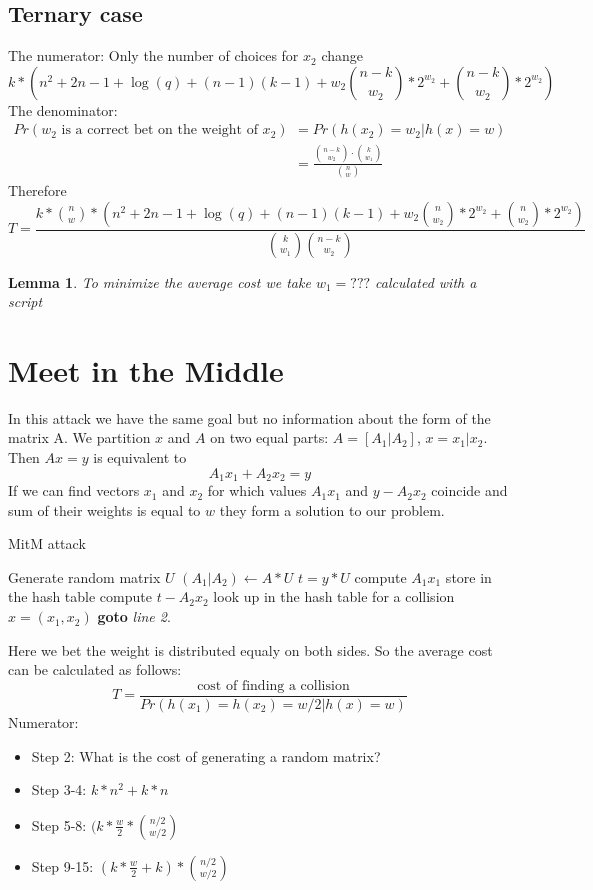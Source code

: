 \documentclass[12pt]{article}
\newtheorem{lemma}{Lemma}
\begin{document}
\subsection{Ternary case}
The numerator:
Only the number of choices for $x_2$ change
\[
    k*(n^2 + 2n - 1 + \log(q) + (n-1)(k-1) + w_2\binom{n-k}{w_2}*2^{w_2} + \binom{n-k}{w_2}*2^{w_2})
\]
The denominator:
\[
\begin{split}
    Pr(w_2\text{ is a correct bet on the weight of }x_2) & = Pr(h(x_2) = w_2|h(x) = w) \\
    & = \frac{\binom{n-k}{w_2} \cdot \binom{k}{w_1}}{\binom{n}{w}}
\end{split}
\]
Therefore
\[
T = \frac{k*\binom{n}{w}*(n^2 + 2n - 1 + \log(q) + (n-1)(k-1) + w_2\binom{n}{w_2}*2^{w_2} + \binom{n}{w_2}*2^{w_2})}{\binom{k}{w_1}\binom{n-k}{w_2}}
\]
\begin{lemma}
To minimize the average cost we take $w_1 = ???$ calculated with a script
\end{lemma}
\section{Meet in the Middle}
In this attack we have the same goal but no information about the form of the matrix A.
We partition $x$ and $A$ on two equal parts: $A = [A_1 | A_2]$, $x = x_1 | x_2$.
Then $Ax = y$ is equivalent to
\[
    A_1x_1 + A_2x_2 = y
\]
If we can find vectors $x_1$ and $x_2$ for which values $A_1x_1$ and $y - A_2x_2$ coincide
and sum of their weights is equal to $w$ they form a solution to our problem.


\begin{algorithm}
\caption{MitM attack}\label{MitM}
\begin{algorithmic}[1]
    \State Generate random matrix $U$
    \State $(A_1|A_2) \gets A * U$
    \State $t = y * U$
    \State compute $A_1x_1$
    \State store in the hash table
    \EndFor
    \State compute $t - A_2x_2$
    \State look up in the hash table for a collision
        \State \Return $x = (x_1, x_2)$
    \EndIf
    \EndFor
\State \textbf{goto} \emph{line 2}.
\EndProcedure
\end{algorithmic}
\end{algorithm}


Here we bet the weight is distributed equaly on both sides. So the average cost can be calculated as follows:
\[
  T = \frac{\text{cost of finding a collision}}{Pr(h(x_1) = h(x_2) = w/2| h(x) =w)}
\]
Numerator:
\begin{itemize}
    \item Step 2: What is the cost of generating a random matrix?
    \item Step 3-4: $k*n^2 + k*n$
    \item Step 5-8: $(k*\frac{w}{2}*\binom{n/2}{w/2}$
    \item Step 9-15: $(k*\frac{w}{2} + k)*\binom{n/2}{w/2}$
\end{itemize}
\end{document}
